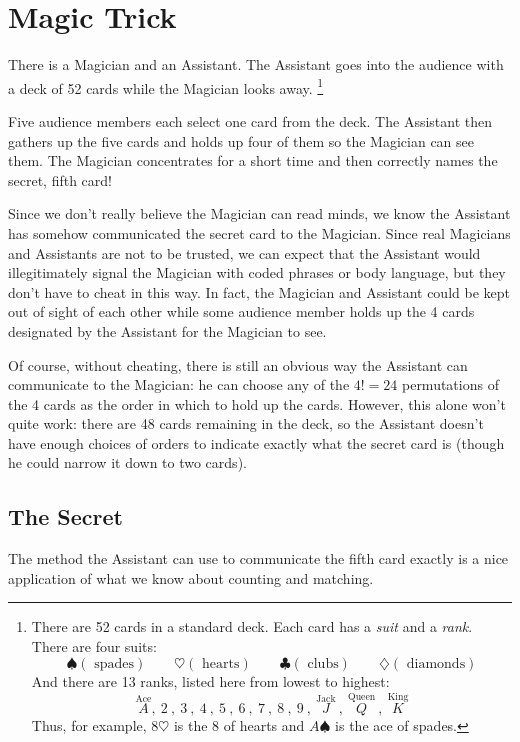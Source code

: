 \section{Magic Trick}

There is a Magician and an Assistant.  The Assistant goes into the
audience with a deck of 52 cards while the Magician looks away.%
\footnote{ There are 52 cards in a standard deck.  Each card has a
  \emph{suit} and a \emph{rank}.  There are four suits:
%
\[
\spadesuit (\text{ spades}) \qquad
\heartsuit (\text{ hearts}) \qquad
\clubsuit (\text{ clubs}) \qquad
\diamondsuit (\text{ diamonds})
\]
%
And there are 13 ranks, listed here from lowest to highest:
%
\[
\stackrel{\text{Ace}}{A},\
2\ ,\ 3\ ,\ 4\ ,\ 5\ ,\ 6\ ,\ 7\ ,\ 8\ ,\ 9\ ,\
\stackrel{\text{Jack}}{J}\ ,\
\stackrel{\text{Queen}}{Q}\ ,\
\stackrel{\text{King}}{K}
\]
%
Thus, for example, $8 \heartsuit$ is the 8 of hearts and $A
\spadesuit$ is the ace of spades.}

Five audience members each select one card from the deck.  The Assistant
then gathers up the five cards and holds up four of them so the Magician
can see them.  The Magician concentrates for a short time and then
correctly names the secret, fifth card!

Since we don't really believe the Magician can read minds, we know the
Assistant has somehow communicated the secret card to the Magician.  Since
real Magicians and Assistants are not to be trusted, we can expect that
the Assistant would illegitimately signal the Magician with coded phrases
or body language, but they don't have to cheat in this way.  In fact, the
Magician and Assistant could be kept out of sight of each other while some
audience member holds up the 4 cards designated by the Assistant for the
Magician to see.

Of course, without cheating, there is still an obvious way the Assistant
can communicate to the Magician: he can choose any of the $4! = 24$
permutations of the 4 cards as the order in which to hold up the cards.
However, this alone won't quite work: there are 48 cards remaining in the
deck, so the Assistant doesn't have enough choices of orders to indicate
exactly what the secret card is (though he could narrow it down to two
cards).

\subsection{The Secret}

The method the Assistant can use to communicate the fifth card exactly is
a nice application of what we know about counting and matching.



